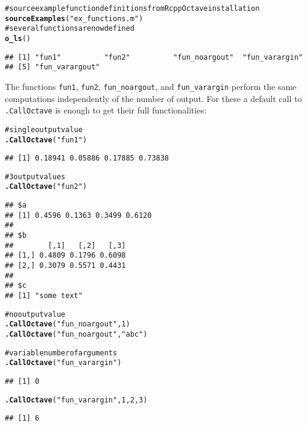 \documentclass[english,10pt,a4paper]{article}\usepackage{graphicx, color}
\makeatletter
\newcommand{\hlfunctioncall}[1]{\textcolor[rgb]{0.501960784313725,0,0.329411764705882}{\textbf{#1}}}%
\newcommand{\hlstring}[1]{\textcolor[rgb]{0.6,0.6,1}{#1}}%
\newcommand{\hlcomment}[1]{\textcolor[rgb]{0.180392156862745,0.6,0.341176470588235}{#1}}%
\newenvironment{kframe}{%
 \def\at@end@of@kframe{}%
 \ifinner\ifhmode%
  \def\at@end@of@kframe{\end{minipage}}%
  \begin{minipage}{\columnwidth}%
 \fi\fi%
 \def\FrameCommand##1{\hskip\@totalleftmargin \hskip-\fboxsep
 \colorbox{shadecolor}{##1}\hskip-\fboxsep
     \hskip-\linewidth \hskip-\@totalleftmargin \hskip\columnwidth}%
 \MakeFramed {\advance\hsize-\width
   \@totalleftmargin\z@ \linewidth\hsize
   \@setminipage}}%
 {\par\unskip\endMakeFramed%
 \at@end@of@kframe}
\newenvironment{knitrout}{}{} %
\let\code=\texttt
\makeatother
\begin{document}
\begin{knitrout}
\color{fgcolor}\begin{kframe}
\begin{alltt}
\hlcomment{# source example function definitions from RcppOctave installation}
\hlfunctioncall{sourceExamples}(\hlstring{"ex_functions.m"})
\hlcomment{# several functions are now defined}
\hlfunctioncall{o_ls}()
\end{alltt}
\begin{verbatim}
## [1] "fun1"          "fun2"          "fun_noargout"  "fun_varargin" 
## [5] "fun_varargout"
\end{verbatim}
\end{kframe}
\end{knitrout}


The functions \code{fun1}, \code{fun2}, \code{fun\_noargout}, and
\code{fun\_varargin} perform the same computations independently of the number
of output.
For these a default call to \code{.CallOctave} is enough to get their full
functionalities:

\begin{knitrout}
\color{fgcolor}\begin{kframe}
\begin{alltt}
\hlcomment{# single output value}
\hlfunctioncall{.CallOctave}(\hlstring{"fun1"})
\end{alltt}
\begin{verbatim}
## [1] 0.18941 0.05886 0.17885 0.73838
\end{verbatim}
\begin{alltt}
\hlcomment{# 3 output values}
\hlfunctioncall{.CallOctave}(\hlstring{"fun2"})
\end{alltt}
\begin{verbatim}
## $a
## [1] 0.4596 0.1363 0.3499 0.6120
## 
## $b
##        [,1]   [,2]   [,3]
## [1,] 0.4809 0.1796 0.6098
## [2,] 0.3079 0.5571 0.4431
## 
## $c
## [1] "some text"
\end{verbatim}
\begin{alltt}

\hlcomment{# no output value}
\hlfunctioncall{.CallOctave}(\hlstring{"fun_noargout"}, 1)
\hlfunctioncall{.CallOctave}(\hlstring{"fun_noargout"}, \hlstring{"abc"})

\hlcomment{# variable number of arguments}
\hlfunctioncall{.CallOctave}(\hlstring{"fun_varargin"})
\end{alltt}
\begin{verbatim}
## [1] 0
\end{verbatim}
\begin{alltt}
\hlfunctioncall{.CallOctave}(\hlstring{"fun_varargin"}, 1, 2, 3)
\end{alltt}
\begin{verbatim}
## [1] 6
\end{verbatim}
\end{kframe}
\end{knitrout}
\end{document}
